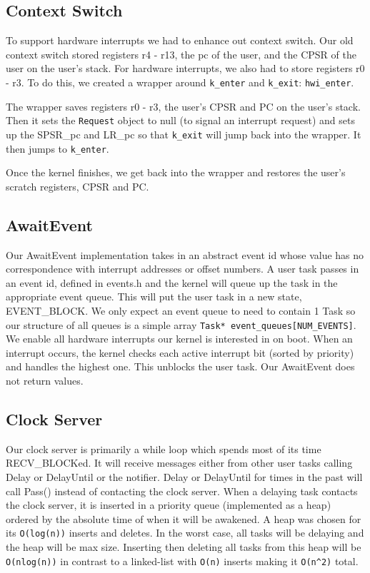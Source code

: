 \documentclass[letterpaper]{article}
\begin{document}
\subsection{Context Switch}

To support hardware interrupts we had to enhance out context switch. Our old context switch stored registers r4 - r13, the pc of the user, and the CPSR of the user on the user's stack. For hardware interrupts, we also had to store registers r0 - r3. To do this, we created a wrapper around {\tt k\_enter} and {\tt k\_exit}: {\tt hwi\_enter}.

The wrapper saves registers r0 - r3, the user's CPSR and PC on the user's stack. Then it sets the {\tt Request} object to null (to signal an interrupt request) and sets up the SPSR\_pc and LR\_pc so that {\tt k\_exit} will jump back into the wrapper. It then jumps to {\tt k\_enter}.

Once the kernel finishes, we get back into the wrapper and restores the user's scratch registers, CPSR and PC.

\subsection{AwaitEvent}

Our AwaitEvent implementation takes in an abstract event id whose value has no correspondence with interrupt addresses or offset numbers. A user task passes in an event id, defined in events.h and the kernel will queue up the task in the appropriate event queue. This will put the user task in a new state, EVENT\_BLOCK. We only expect an event queue to need to contain 1 Task so our structure of all queues is a simple array \verb!Task* event_queues[NUM_EVENTS]!. We enable all hardware interrupts our kernel is interested in on boot. When an interrupt occurs, the kernel checks each active interrupt bit (sorted by priority) and handles the highest one. This unblocks the user task. Our AwaitEvent does not return values.

\subsection{Clock Server}

Our clock server is primarily a while loop which spends most of its time RECV\_BLOCKed. It will receive messages either from other user tasks calling Delay or DelayUntil or the notifier. Delay or DelayUntil for times in the past will call Pass() instead of contacting the clock server. When a delaying task contacts the clock server, it is inserted in a priority queue (implemented as a heap) ordered by the absolute time of when it will be awakened. A heap was chosen for its \verb!O(log(n))! inserts and deletes. In the worst case, all tasks will be delaying and the heap will be max size. Inserting then deleting all tasks from this heap will be \verb!O(nlog(n))! in contrast to a linked-list with \verb!O(n)! inserts making it \verb!O(n^2)! total.
\end{document}
